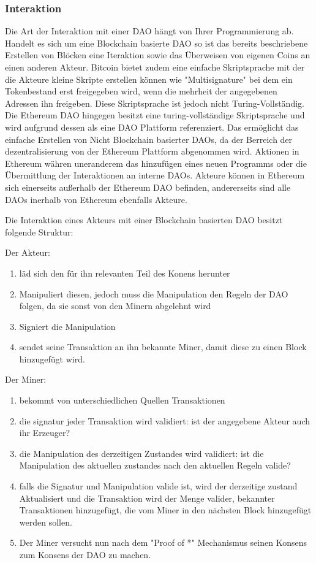 \documentclass[]{article}
\begin{document}
\subsubsection*{Interaktion}
Die Art der Interaktion mit einer DAO hängt von Ihrer Programmierung ab. Handelt es sich um eine Blockchain basierte DAO so ist das bereits beschriebene Erstellen von Blöcken eine Iteraktion sowie das Überweisen von eigenen Coins an einen anderen Akteur. Bitcoin bietet zudem eine einfache Skriptsprache mit der die Akteure kleine Skripte erstellen können wie "Multisignature" bei dem ein Tokenbestand erst freigegeben wird, wenn die mehrheit der angegebenen Adressen ihn freigeben. Diese Skriptsprache ist jedoch nicht Turing-Vollständig. Die Ethereum DAO hingegen besitzt eine turing-vollständige Skriptsprache und wird aufgrund dessen als eine DAO Plattform referenziert. Das ermöglicht das einfache Erstellen von Nicht Blockchain basierter DAOs, da der Berreich der dezentralisierung von der Ethereum Plattform abgenommen wird. Aktionen in Ethereum währen uneranderem das hinzufügen eines neuen Programms oder die Übermittlung der Interaktionen an interne DAOs. Akteure können in Ethereum sich einerseits außerhalb der Ethereum DAO befinden, andererseits sind alle DAOs inerhalb von Ethereum ebenfalls Akteure.

Die Interaktion eines Akteurs mit einer Blockchain basierten DAO besitzt folgende Struktur:

Der Akteur:
\begin{enumerate}
  \item läd sich den für ihn relevanten Teil des Konens herunter
  \item Manipuliert diesen, jedoch muss die Manipulation den Regeln der DAO folgen, da sie sonst von den Minern abgelehnt wird
  \item Signiert die Manipulation
  \item sendet seine Transaktion an ihn bekannte Miner, damit diese zu einen Block hinzugefügt wird.
\end{enumerate}

Der Miner:
\begin{enumerate}
  \item bekommt von unterschiedlichen Quellen Transaktionen
  \item die signatur jeder Transaktion wird validiert: ist der angegebene Akteur auch ihr Erzeuger?
  \item die Manipulation des derzeitigen Zustandes wird validiert: ist die Manipulation des aktuellen zustandes nach den aktuellen Regeln valide?
  \item falls die Signatur und Manipulation valide ist, wird der derzeitige zustand Aktualisiert und die Transaktion wird der Menge valider, bekannter Transaktionen hinzugefügt, die vom Miner in den nächsten Block hinzugefügt werden sollen.
  \item Der Miner versucht nun nach dem "Proof of *" Mechanismus seinen Konsens zum Konsens der DAO zu machen.
\end{enumerate}
\end{document}
